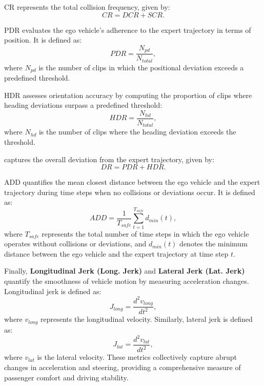  CR represents the total collision frequency, given by:  
\begin{equation}
CR = DCR + SCR.
\end{equation}

 PDR evaluates the ego vehicle’s adherence to the expert trajectory in terms of position. It is defined as:  
\begin{equation}
PDR = \frac{N_{pd}}{N_{total}},
\end{equation}
where \( N_{pd} \) is the number of clips in which the positional deviation exceeds a predefined threshold.  

 HDR assesses orientation accuracy by computing the proportion of clips where heading deviations surpass a predefined threshold:  
\begin{equation}
HDR = \frac{N_{hd}}{N_{total}},
\end{equation}
where \( N_{hd} \) is the number of clips where the heading deviation exceeds the threshold.  

 captures the overall deviation from the expert trajectory, given by:  
\begin{equation}
DR = PDR + HDR.
\end{equation}

 ADD quantifies the mean closest distance between the ego vehicle and the expert trajectory during time steps when no collisions or deviations occur. It is defined as:  
\begin{equation}
ADD = \frac{1}{T_{safe}} \sum_{t=1}^{T_{safe}} d_{min}(t),
\end{equation}
where \( T_{safe} \) represents the total number of time steps in which the ego vehicle operates without collisions or deviations, and \( d_{min}(t) \) denotes the minimum distance between the ego vehicle and the expert trajectory at time step \( t \).  

Finally, \textbf{Longitudinal Jerk (Long. Jerk)} and \textbf{Lateral Jerk (Lat. Jerk)} quantify the smoothness of vehicle motion by measuring acceleration changes. Longitudinal jerk is defined as:  
\begin{equation}
J_{long} = \frac{d^2 v_{long}}{dt^2},
\end{equation}
where \( v_{long} \) represents the longitudinal velocity. Similarly, lateral jerk is defined as:  
\begin{equation}
J_{lat} = \frac{d^2 v_{lat}}{dt^2},
\end{equation}
where \( v_{lat} \) is the lateral velocity. These metrics collectively capture abrupt changes in acceleration and steering, providing a comprehensive measure of passenger comfort and driving stability.

